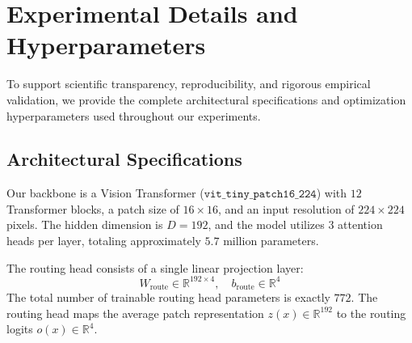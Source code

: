\documentclass{article}
\theoremstyle{plain}
\theoremstyle{definition}
\theoremstyle{remark}
\begin{document}










\newpage
\appendix
\onecolumn
\section{Experimental Details and Hyperparameters}
\label{appendix:details}

To support scientific transparency, reproducibility, and rigorous empirical validation, we provide the complete architectural specifications and optimization hyperparameters used throughout our experiments.

\subsection{Architectural Specifications}
Our backbone is a Vision Transformer ($\mathtt{vit\_tiny\_patch16\_224}$) with $12$ Transformer blocks, a patch size of $16 \times 16$, and an input resolution of $224 \times 224$ pixels. The hidden dimension is $D = 192$, and the model utilizes $3$ attention heads per layer, totaling approximately $5.7$ million parameters. 

The routing head consists of a single linear projection layer:
\begin{equation}
    W_{\text{route}} \in \mathbb{R}^{192 \times 4}, \quad b_{\text{route}} \in \mathbb{R}^4
\end{equation}
The total number of trainable routing head parameters is exactly $772$. The routing head maps the average patch representation $z(x) \in \mathbb{R}^{192}$ to the routing logits $o(x) \in \mathbb{R}^4$.
\end{document}
